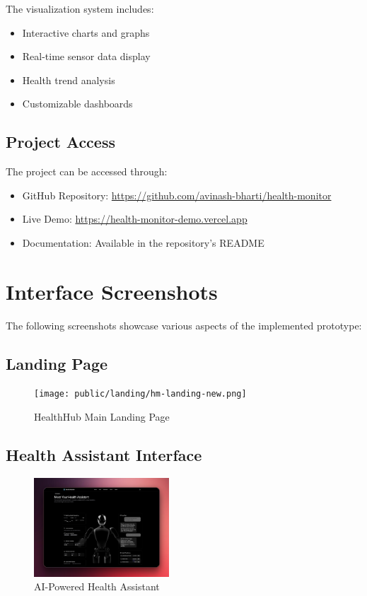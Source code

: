 The visualization system includes:
\begin{itemize}
    \item Interactive charts and graphs
    \item Real-time sensor data display
    \item Health trend analysis
    \item Customizable dashboards
\end{itemize}

\subsection{Project Access}
The project can be accessed through:

\begin{itemize}
    \item GitHub Repository: \url{https://github.com/avinash-bharti/health-monitor}
    \item Live Demo: \url{https://health-monitor-demo.vercel.app}
    \item Documentation: Available in the repository's README
\end{itemize}

\section{Interface Screenshots}
The following screenshots showcase various aspects of the implemented prototype:

\subsection{Landing Page}
\begin{figure}[H]
    \centering
    \texttt{[image: public/landing/hm-landing-new.png]}
    \caption{HealthHub Main Landing Page}
\end{figure}

\subsection{Health Assistant Interface}
\begin{figure}[H]
    \centering
    \includegraphics[width=0.45\textwidth]{public/landing/hm-landing-health-assistant-3.png}
    \caption{AI-Powered Health Assistant}
\end{figure}

